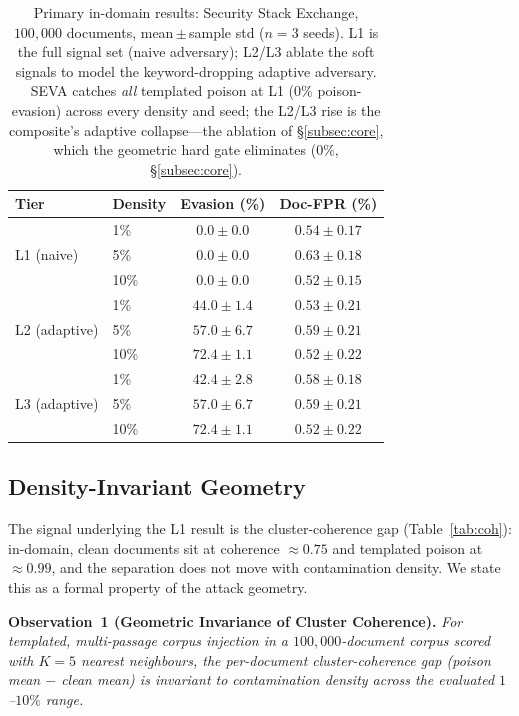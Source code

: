 \documentclass[10pt,journal,compsoc]{IEEEtran}
\begin{document}
\begin{table}[t]
\centering
\caption{Primary in-domain results: Security Stack Exchange, $100{,}000$
documents, mean\,$\pm$\,sample std ($n=3$ seeds). L1 is the full signal set (naive
adversary); L2/L3 ablate the soft signals to model the keyword-dropping adaptive
adversary. SEVA catches \emph{all} templated poison at L1 ($0\%$ poison-evasion)
across every density and seed; the L2/L3 rise is the composite's adaptive collapse---the
ablation of \S\ref{subsec:core}, which the geometric hard gate eliminates
($0\%$, \S\ref{subsec:core}).}
\label{tab:main}
\begin{tabular}{llcc}
\toprule
Tier & Density & Evasion (\%) & Doc-FPR (\%) \\
\midrule
\multirow{3}{*}{L1 (naive)}    & 1\%  & $\mathbf{0.0\pm0.0}$ & $0.54\pm0.17$ \\
                               & 5\%  & $\mathbf{0.0\pm0.0}$ & $0.63\pm0.18$ \\
                               & 10\% & $\mathbf{0.0\pm0.0}$ & $0.52\pm0.15$ \\
\midrule
\multirow{3}{*}{L2 (adaptive)} & 1\%  & $44.0\pm1.4$ & $0.53\pm0.21$ \\
                               & 5\%  & $57.0\pm6.7$ & $0.59\pm0.21$ \\
                               & 10\% & $72.4\pm1.1$ & $0.52\pm0.22$ \\
\midrule
\multirow{3}{*}{L3 (adaptive)} & 1\%  & $42.4\pm2.8$ & $0.58\pm0.18$ \\
                               & 5\%  & $57.0\pm6.7$ & $0.59\pm0.21$ \\
                               & 10\% & $72.4\pm1.1$ & $0.52\pm0.22$ \\
\bottomrule
\end{tabular}
\end{table}

\subsection{Density-Invariant Geometry}
\label{subsec:geom}
The signal underlying the L1 result is the cluster-coherence gap
(Table~\ref{tab:coh}): in-domain, clean documents sit at coherence $\approx 0.75$
and templated poison at $\approx 0.99$, and the separation does not move with
contamination density. We state this as a formal property of the attack geometry.

\smallskip
\noindent\textbf{Observation~1 (Geometric Invariance of Cluster Coherence).}
\emph{For templated, multi-passage corpus injection in a $100{,}000$-document
corpus scored with $K=5$ nearest neighbours, the per-document cluster-coherence gap
(poison mean $-$ clean mean) is invariant to contamination density across the
evaluated $1$--$10\%$ range.}
\end{document}
